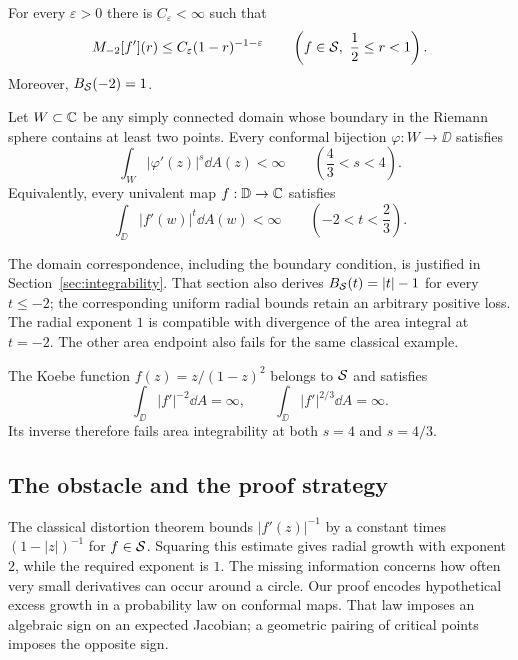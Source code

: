\begin{theorem}
\label{thm:main}
For every $\varepsilon>0$ there is $C_\varepsilon<\infty$ such that
\begin{equation}\label{eq:main-uniform}
 M_{-2}[f'](r)\le C_\varepsilon(1-r)^{-1-\varepsilon}
 \qquad\left(f\in\mathcal S,\ \frac12\le r<1\right).
\end{equation}
Moreover, $B_{\mathcal S}(-2)=1$.

Let $W\subset\mathbb C$ be any simply connected domain whose boundary in
the Riemann sphere contains at least two points. Every conformal
bijection $\varphi:W\to\DD$ satisfies
\[
 \int_W|\varphi'(z)|^s\dd A(z)<\infty
 \qquad\left(\frac43<s<4\right).
\]
Equivalently, every univalent map $f:\mathbb D\to\mathbb C$ satisfies
\[
 \int_{\DD}|f'(w)|^t\dd A(w)<\infty
 \qquad\left(-2<t<\frac23\right).
\]
\end{theorem}

The domain correspondence, including the boundary condition, is
justified in Section~\ref{sec:integrability}. That section also derives
$B_{\mathcal S}(t)=|t|-1$ for every $t\le-2$; the corresponding uniform
radial bounds retain an arbitrary positive loss. The radial exponent $1$
is compatible with divergence of the area integral at $t=-2$.
The other area endpoint also fails for the same classical example.

\begin{corollary}\label{cor:sharp-endpoints}
The Koebe function $f(z)=z/(1-z)^2$ belongs to $\mathcal S$ and satisfies
\[
 \int_{\DD}|f'|^{-2}\dd A=\infty,
 \qquad
 \int_{\DD}|f'|^{2/3}\dd A=\infty.
\]
Its inverse therefore fails area integrability at both $s=4$ and $s=4/3$.
\end{corollary}



\subsection{The obstacle and the proof strategy}

The classical distortion theorem bounds $|f'(z)|^{-1}$ by a constant
times $(1-|z|)^{-1}$ for $f\in\mathcal S$. Squaring this estimate gives
radial growth with exponent $2$, while the required exponent is $1$.
The missing information concerns how often very small derivatives can
occur around a circle. Our proof encodes hypothetical excess growth in
a probability law on conformal maps. That law imposes an algebraic sign
on an expected Jacobian; a geometric pairing of critical points imposes
the opposite sign.

